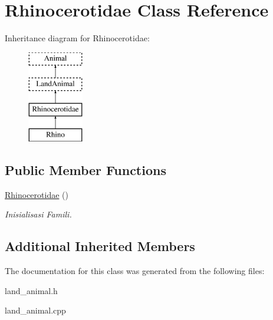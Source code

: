 \hypertarget{class_rhinocerotidae}{}\section{Rhinocerotidae Class Reference}
\label{class_rhinocerotidae}
Inheritance diagram for Rhinocerotidae\+:\begin{figure}[H]
\begin{center}
\leavevmode
\includegraphics[height=4.000000cm]{class_rhinocerotidae}
\end{center}
\end{figure}
\subsection*{Public Member Functions}
\begin{DoxyCompactItemize}
\item 
\hyperlink{class_rhinocerotidae_a9c528192b9288afe3c939a2668048eaf}{Rhinocerotidae} ()\hypertarget{class_rhinocerotidae_a9c528192b9288afe3c939a2668048eaf}{}\label{class_rhinocerotidae_a9c528192b9288afe3c939a2668048eaf}

\begin{DoxyCompactList}\small\item\em Inisialisasi Famili. \end{DoxyCompactList}\end{DoxyCompactItemize}
\subsection*{Additional Inherited Members}


The documentation for this class was generated from the following files\+:\begin{DoxyCompactItemize}
\item 
land\+\_\+animal.\+h\item 
land\+\_\+animal.\+cpp\end{DoxyCompactItemize}
